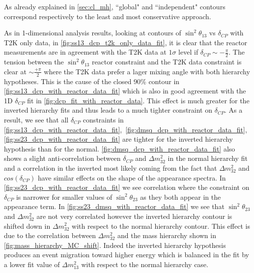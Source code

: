 As already explained in \cref{sec:cl_mh}, ``global" and ``independent" contours correspond
respectively to the least and most conservative approach.

As in 1-dimensional analysis results,
looking at contours of $\sin^2 \theta_{13}$ vs $\delta_{CP}$ with T2K only data, 
in \cref{fig:ss13_dcp_t2k_only_data_fit}, it is clear that the reactor measurements are 
in agreement with the T2K data at $1\sigma$ level if $\delta_{CP} \sim - \frac{\pi}{2}$. The tension 
between the $\sin^2 \theta_{13}$ reactor constraint and the T2K data constraint is clear at 
$\sim \frac{+\pi}{2}$ where the T2K data prefer a lager mixing angle with both hierarchy hypotheses.
This is the cause of the closed 90\% contour in \cref{fig:ss13_dcp_with_reactor_data_fit} which is also in good agreement with the 1D $\delta_{CP}$ fit in \cref{fig:dcp_fit_with_reactor_data}. This effect is much greater for the inverted hierarchy fits and thus leads to a much tighter constraint on $\delta_{CP}$. 
As a result, we see that all $\delta_{CP}$ constraints in 
\cref{fig:ss13_dcp_with_reactor_data_fit},~\ref{fig:dmsq_dcp_with_reactor_data_fit},~\ref{fig:ss23_dcp_with_reactor_data_fit} 
are tighter for the inverted hierarchy hypothesis than for the normal.
\cref{fig:dmsq_dcp_with_reactor_data_fit} also shows a slight anti-correlation between $\delta_{CP}$ 
and $\Delta m^2_{32}$ in the normal hierarchy fit and a correlation in the inverted most likely coming 
from the fact that $\Delta m^2_{32}$ and $cos(\delta_{CP})$ have similar effects on the shape of the appearance spectra. 
In \cref{fig:ss23_dcp_with_reactor_data_fit} we see correlation where the constraint on $\delta_{CP}$ is narrower 
for smaller values of $\sin^2 \theta_{23}$ as they both appear in the appearance term. 
In \cref{fig:ss23_dmsq_with_reactor_data_fit} we see that $\sin^2 \theta_{23}$ and $\Delta m^2_{32}$ 
are not very correlated however the inverted hierarchy contour is shifted down in $\Delta m^2_{32}$ 
with respect to the normal hierarchy contour. 
This effect is due to the correlation between $\Delta m^2_{32}$ and the mass hierarchy shown in \cref{fig:mass_hierarchy_MC_shift}. 
Indeed the inverted hierarchy hypothesis produces an event migration toward higher energy 
which is balanced in the fit by a lower fit value of $\Delta m^2_{13}$ with respect to the normal hierarchy case.


